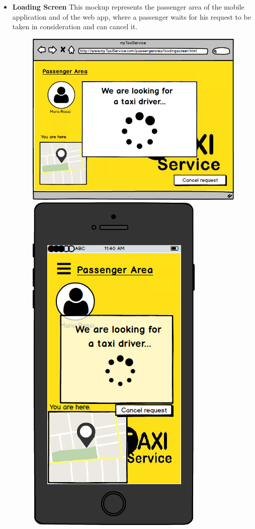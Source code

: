 \documentclass[18pt,oneside,a4paper, titlepage]{article}
\begin{document}
\begin{itemize}
\begin{figure}[h]
				\end{figure}
				\\
				\item \textbf{Loading Screen} This mockup represents the passenger area of the mobile application and of the web app, where a passenger waits for his request to be taken in consideration and can cancel it.\\
				\begin{figure}[h]
					\includegraphics[scale=0.3]{WebAppWaitForTaxi.png}%
					\qquad\qquad
					\includegraphics[scale=0.3]{MobileAppWaitForTaxi.png}

\end{figure}
\end{itemize}
\end{document}
